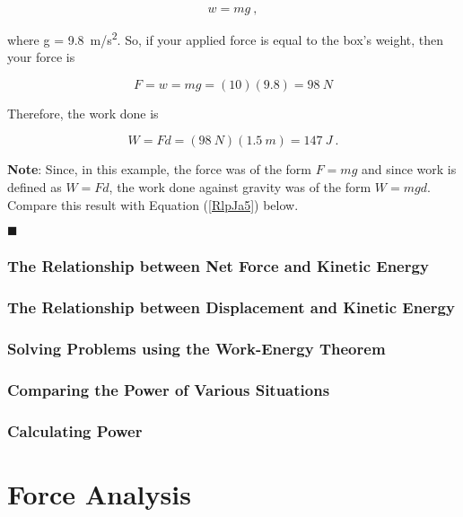 \documentclass[dvipsnames]{article}
\begin{document}
\begin{equation*}
    w = m g\ ,
\end{equation*}

where  g = \SI{9.8}{m/s^2}. So, if your applied force is equal to the box's weight, then your force is

\begin{equation*}
    F = w = mg = (10)(9.8) = \SI{98}{N}
\end{equation*}

Therefore, the work done is

\begin{equation*}
    W = F d = (\SI{98}{N})(\SI{1.5}{m}) = \SI{147}{J} \ .
\end{equation*}

\textbf{Note}: Since, in this example, the force was of the form $F = mg$ and since work is defined as $W = F d$, the work done against gravity was of the form $W = mgd$. Compare this result with Equation (\ref{RlpJa5}) below.

\hfill $\blacksquare$

\subsubsection{The Relationship between Net Force and Kinetic Energy}

\subsubsection{The Relationship between Displacement and Kinetic Energy}

\subsubsection{Solving Problems using the Work-Energy Theorem}

\subsubsection{Comparing the Power of Various Situations}

\subsubsection{Calculating Power}

\fi

\clearpage

\section{Force Analysis}
\end{document}
